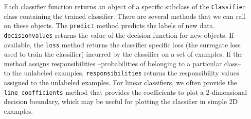 \documentclass[twoside]{memoir}\usepackage[]{graphicx}\usepackage{xcolor}
\begin{document}
Each classifier function returns an object of a specific subclass of the \texttt{Classifier} class containing the trained classifier. There are several methods that we can call on these objects. The \texttt{predict} method predicts the labels of new data. \texttt{decisionvalues} returns the value of the decision function for new objects. If available, the \texttt{loss} method returns the classifier specific loss (the surrogate loss used to train the classifier) incurred by the classifier on a set of examples. If the method assigns responsibilities --probabilities of belonging to a particular class-- to the unlabeled examples, \texttt{responsibilities} returns the responsibility values assigned to the unlabeled examples. For linear classifiers, we often provide the \texttt{line\_coefficients} method that provides the coefficients to plot a 2-dimensional decision boundary, which may be useful for plotting the classifier in simple 2D examples.
\end{document}
